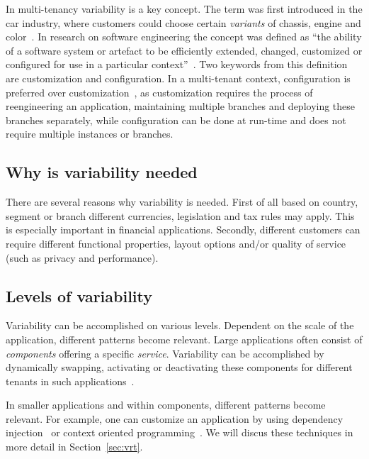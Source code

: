 In multi-tenancy variability is a key concept. The term was first introduced in the car industry, where customers could choose certain \textit{variants} of chassis, engine and color~\cite[p. 153]{kabbedijk2011variability}. 
In research on software engineering the concept was defined as ``the ability of a software system or artefact to be efficiently extended, changed, customized or configured for use in a particular context''~\cite{svahnberg2005taxonomy}.
Two keywords from this definition are customization and configuration. 
In a multi-tenant context, configuration is preferred over customization~\cite{sun2008software}, as customization requires the process of reengineering an application, maintaining multiple branches and deploying these branches separately, while configuration can be done at run-time and does not require multiple instances or branches.

\subsection{Why is variability needed}
There are several reasons why variability is needed. 
First of all based on country, segment or branch different currencies, legislation and tax rules may apply. This is especially important in financial applications. 
Secondly, different customers can require different functional properties, layout options and/or quality of service (such as privacy and performance).

\subsection{Levels of variability}
Variability can be accomplished on various levels. 
Dependent on the scale of the application, different patterns become relevant. Large applications often consist of \textit{components} offering a specific \textit{service}. Variability can be accomplished by dynamically swapping, activating or deactivating  these components for different tenants in such applications~\cite{mietzner2008defining}. 

In smaller applications and within components, different patterns become relevant. For example, one can customize an application by using dependency injection~\cite{walraven2011middleware} or context oriented programming~\cite{truyen2012context}. We will discus these techniques in more detail in Section~\ref{sec:vrt}.

